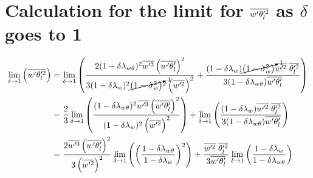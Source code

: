 \section{Calculation for the limit for \texorpdfstring{$\overline{w' \theta_l'^2}$}{wprimethetalprime2bar} as \texorpdfstring{$\delta$}{delta} goes to 1}
\label{sec:calculation-for-the-limit-for-wprimethetalprime2bar-as-delta-goes-to-1}

\begin{align}
    \label{eq:limit_wprimethetalprime2bar_delta_to_1_calc}
    \lim_{\delta \to 1}\left(\overline{w' \theta_l'^2}\right)
    &= \lim_{\delta \to 1}
    \left(
    \frac{
        2 (1-\delta \lambda_{w \theta})^2 \overline{w'^3} \left(\overline{w' \theta_l'} \right)^2
    }
    {3 (1-\delta \lambda_w)^2 \cancelto{1}{\left( 1 - \tilde{\sigma}_w^2 \right)}^2 \left(\overline{w'^2} \right)^2} +
    \frac{
        (1-\delta \lambda_w) \cancelto{1}{\left( 1 - \tilde{\sigma}_w^2 \right)} \overline{w'^2} \; \overline{\theta_l'^2}
    }
    {3 (1-\delta \lambda_{w \theta}) \overline{w' \theta_l'}}
    \right)
    \\
    &= \frac{2}{3} \lim_{\delta \to 1}
    \left(
    \frac{(1-\delta \lambda_{w \theta})^2 \overline{w'^3} \left(\overline{w' \theta_l'} \right)^2}
    {(1-\delta \lambda_w)^2 \left(\overline{w'^2} \right)^2}
    \right) +
    \lim_{\delta \to 1}
    \left(
    \frac{
        (1-\delta \lambda_w) \overline{w'^2} \; \overline{\theta_l'^2}
    }
    {
        3 (1-\delta \lambda_{w \theta}) \overline{w' \theta_l'}
    }
    \right)
    \\
    &= \frac{2 \overline{w'^3} \left(\overline{w' \theta_l'} \right)^2}{3 \left(\overline{w'^2} \right)^2} \lim_{\delta \to 1}
    \left(\left(\frac{1-\delta \lambda_{w \theta}}{1-\delta \lambda_w}\right)^2\right) +
    \frac{\overline{w'^2} \; \overline{\theta_l'^2}}{3 \overline{w' \theta_l'}}
    \lim_{\delta \to 1}
    \left(\frac{1-\delta \lambda_w}{1-\delta \lambda_{w \theta}}\right)
\end{align}